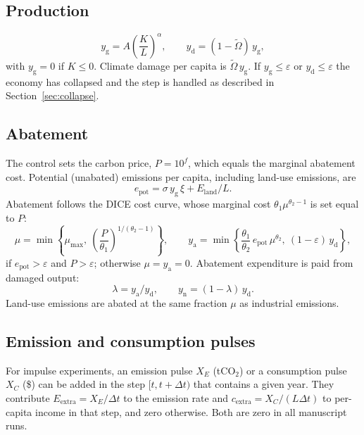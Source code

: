 \documentclass[11pt]{article}
\newcommand{\yg}{y_{\mathrm{g}}}
\newcommand{\yd}{y_{\mathrm{d}}}
\newcommand{\yn}{y_{\mathrm{n}}}
\newcommand{\ya}{y_{\mathrm{a}}}
\newcommand{\Eland}{E_{\mathrm{land}}}
\newcommand{\epot}{e_{\mathrm{pot}}}
\begin{document}
\subsection{Production}

\begin{equation}
  \yg = A\left(\frac{K}{L}\right)^{\alpha}, \qquad
  \yd = (1-\tilde\Omega)\,\yg ,
\end{equation}
with $\yg = 0$ if $K\le0$. Climate damage per capita is $\tilde\Omega\,\yg$.
If $\yg\le\varepsilon$ or $\yd\le\varepsilon$ the economy has collapsed and
the step is handled as described in Section~\ref{sec:collapse}.

\subsection{Abatement}
\label{sec:abatement}

The control sets the carbon price, $P = 10^{f}$, which equals the marginal
abatement cost. Potential (unabated) emissions per capita, including land-use
emissions, are
\begin{equation}
  \epot = \sigma\,\yg\,\xi + \Eland/L .
\end{equation}
Abatement follows the DICE cost curve, whose marginal cost
$\theta_1\mu^{\theta_2-1}$ is set equal to $P$:
\begin{equation}
  \mu = \min\left\{\mu_{\max},\ \left(\frac{P}{\theta_1}\right)^{1/(\theta_2-1)}\right\},
  \qquad
  \ya = \min\left\{\frac{\theta_1}{\theta_2}\,\epot\,\mu^{\theta_2},\
  (1-\varepsilon)\,\yd\right\},
  \label{eq:abatement}
\end{equation}
if $\epot > \varepsilon$ and $P > \varepsilon$; otherwise $\mu = \ya = 0$.
Abatement expenditure is paid from damaged output:
\begin{equation}
  \lambda = \ya/\yd, \qquad \yn = (1-\lambda)\,\yd .
\end{equation}
Land-use emissions are abated at the same fraction $\mu$ as industrial
emissions.

\subsection{Emission and consumption pulses}
\label{sec:pulses}

For impulse experiments, an emission pulse $X_E$ (tCO$_2$) or a consumption
pulse $X_C$ (\$) can be added in the step $[t, t+\Delta t)$ that contains a
given year. They contribute $E_{\mathrm{extra}} = X_E/\Delta t$ to the
emission rate and $c_{\mathrm{extra}} = X_C/(L\Delta t)$ to per-capita income
in that step, and zero otherwise. Both are zero in all manuscript runs.
\end{document}
